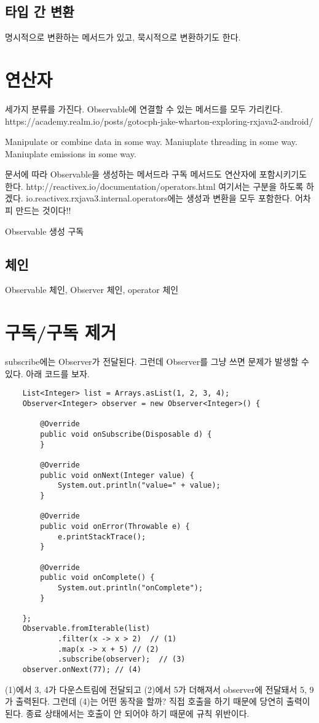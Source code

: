 \documentclass{book}
\begin{document}
\subsection{타입 간 변환}
명시적으로 변환하는 메서드가 있고, 묵시적으로 변환하기도 한다.

\section{연산자}
세가지 분류를 가진다. Observable에 연결할 수 있는 메서드를 모두 가리킨다.
https://academy.realm.io/posts/gotocph-jake-wharton-exploring-rxjava2-android/

Manipulate or combine data in some way.
Maniuplate threading in some way.
Maniuplate emissions in some way.

문서에 따라 Observable을 생성하는 메서드라 구독 메서드도 연산자에 포함시키기도 한다.
http://reactivex.io/documentation/operators.html
여기서는 구분을 하도록 하겠다.
io.reactivex.rxjava3.internal.operators에는 생성과 변환을 모두 포함한다.
어차피 만드는 것이다!!

Observable 생성
구독

\subsection{체인}
Observable 체인, Observer 체인, operator 체인


\section{구독/구독 제거}
subscribe에는 Observer가 전달된다. 그런데 Observer를 그냥 쓰면 문제가 발생할 수 있다.
아래 코드를 보자.
\begin{verbatim}
	List<Integer> list = Arrays.asList(1, 2, 3, 4);
	Observer<Integer> observer = new Observer<Integer>() {

		@Override
		public void onSubscribe(Disposable d) {
		}

		@Override
		public void onNext(Integer value) {
			System.out.println("value=" + value);
		}

		@Override
		public void onError(Throwable e) {
			e.printStackTrace();
		}

		@Override
		public void onComplete() {
			System.out.println("onComplete");
		}

	};
	Observable.fromIterable(list)
			.filter(x -> x > 2)  // (1)
			.map(x -> x + 5) // (2)
			.subscribe(observer);  // (3)
	observer.onNext(77); // (4)		
\end{verbatim}
(1)에서 3, 4가 다운스트림에 전달되고 (2)에서 5가 더해져서 observer에 전달돼서 5, 9가 출력된다.
그런데 (4)는 어떤 동작을 할까? 
직접 호출을 하기 때문에 당연히 출력이 된다.
종료 상태에서는 호출이 안 되어야 하기 때문에 규칙 위반이다.
\end{document}
